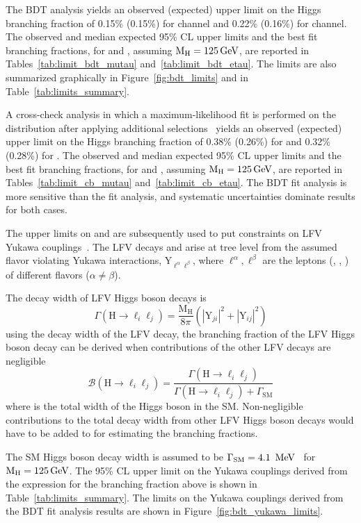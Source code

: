 The BDT analysis yields an observed (expected) upper limit on the Higgs branching fraction of 0.15\% (0.15\%) for \Hmt channel and 0.22\% (0.16\%) for \Het channel. The observed and median expected 95\% CL upper limits and the best fit branching fractions, for \BHmt and \BHet, assuming $\text{M}_{\text{H}} = 125 \,\text{Ge\hspace{-.08em}V}$, are reported in Tables~\ref{tab:limit_bdt_mutau} and~\ref{tab:limit_bdt_etau}. The limits are also summarized graphically in Figure~\ref{fig:bdt_limits} and in Table~\ref{tab:limits_summary}.

A cross-check analysis in which a maximum-likelihood fit is performed on the \mcol distribution after applying additional selections~\cite{Sirunyan:2017xzt} yields an observed (expected) upper limit on the Higgs branching fraction of 0.38\% (0.26\%) for \Hmt and 0.32\% (0.28\%) for \Het. The observed and median expected 95\% CL upper limits and the best fit branching fractions, for \BHmt and \BHet, assuming $\text{M}_{\text{H}} = 125 \,\text{Ge\hspace{-.08em}V}$, are reported in Tables~\ref{tab:limit_cb_mutau} and~\ref{tab:limit_cb_etau}. The BDT fit analysis is more sensitive than the \mcol fit analysis, and systematic uncertainties dominate results for both cases.

The upper limits on \BHmt and \BHet are subsequently used to put constraints on LFV Yukawa couplings~\cite{Harnik:2012pb}. The LFV decays \Pe{}\Pgt and \Pgm{}\Pgt arise at tree level from the assumed flavor violating Yukawa interactions, $\text{Y}_{\ell^\alpha\ell^{\beta}}$, where $\ell^\alpha, \ell^\beta$ are the leptons (\Pe, \Pgm, \Pgt) of different flavors ($\alpha\ne\beta$).

The decay width of LFV Higgs boson decays is
\begin{equation}
  \Gamma(\text{H} \to \ell_{i} \ell_{j})=\frac{\text{M}_{\text{H}}}{8 \pi}(|\text{Y}_{j i}|^2+|\text{Y}_{i j}|^2)
\end{equation}
using the decay width of the LFV decay, the branching fraction of the LFV Higgs boson decay can be derived when contributions of the other LFV decays are negligible
\begin{equation}
  \mathcal{B}(\text{H} \to \ell_{i} \ell_{j})=\frac{\Gamma(\text{H} \to \ell_{i} \ell_{j})}{\Gamma(\text{H} \to \ell_{i} \ell_{j})+\Gamma_{\text{SM}}}
\end{equation}
where \gsm is the total width of the Higgs boson in the SM. Non-negligible contributions to the total decay width from other LFV Higgs boson decays would have to be added to \gsm for estimating the branching fractions.

The SM Higgs boson decay width is assumed to be $\Gamma_{\text{SM}} = 4.1~\,\text{Me\hspace{-.08em}V}$~\cite{Denner:2011mq} for $\text{M}_{\text{H}} = 125 \,\text{Ge\hspace{-.08em}V}$. The 95\% CL upper limit on the Yukawa couplings derived from the expression for the branching fraction above is shown in Table~\ref{tab:limits_summary}. The limits on the Yukawa couplings derived from the BDT fit analysis results are shown in Figure~\ref{fig:bdt_yukawa_limits}.

